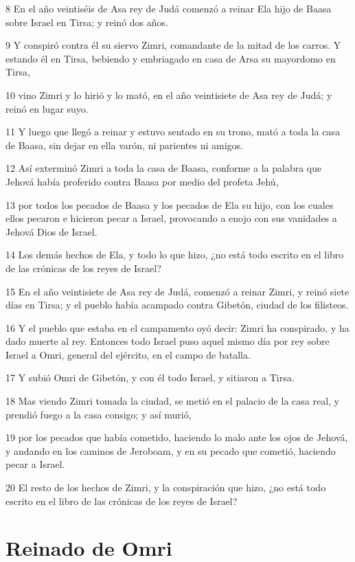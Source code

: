 \par 8 En el año veintiséis de Asa rey de Judá comenzó a reinar Ela hijo de Baasa sobre Israel en Tirsa; y reinó dos años.
\par 9 Y conspiró contra él su siervo Zimri, comandante de la mitad de los carros. Y estando él en Tirsa, bebiendo y embriagado en casa de Arsa su mayordomo en Tirsa,
\par 10 vino Zimri y lo hirió y lo mató, en el año veintisiete de Asa rey de Judá; y reinó en lugar suyo.
\par 11 Y luego que llegó a reinar y estuvo sentado en su trono, mató a toda la casa de Baasa, sin dejar en ella varón, ni parientes ni amigos.
\par 12 Así exterminó Zimri a toda la casa de Baasa, conforme a la palabra que Jehová había proferido contra Baasa por medio del profeta Jehú,
\par 13 por todos los pecados de Baasa y los pecados de Ela su hijo, con los cuales ellos pecaron e hicieron pecar a Israel, provocando a enojo con sus vanidades a Jehová Dios de Israel.
\par 14 Los demás hechos de Ela, y todo lo que hizo, ¿no está todo escrito en el libro de las crónicas de los reyes de Israel?
\par 15 En el año veintisiete de Asa rey de Judá, comenzó a reinar Zimri, y reinó siete días en Tirsa; y el pueblo había acampado contra Gibetón, ciudad de los filisteos.
\par 16 Y el pueblo que estaba en el campamento oyó decir: Zimri ha conspirado, y ha dado muerte al rey. Entonces todo Israel puso aquel mismo día por rey sobre Israel a Omri, general del ejército, en el campo de batalla.
\par 17 Y subió Omri de Gibetón, y con él todo Israel, y sitiaron a Tirsa.
\par 18 Mas viendo Zimri tomada la ciudad, se metió en el palacio de la casa real, y prendió fuego a la casa consigo; y así murió,
\par 19 por los pecados que había cometido, haciendo lo malo ante los ojos de Jehová, y andando en los caminos de Jeroboam, y en su pecado que cometió, haciendo pecar a Israel.
\par 20 El resto de los hechos de Zimri, y la conspiración que hizo, ¿no está todo escrito en el libro de las crónicas de los reyes de Israel?

\section*{Reinado de Omri}

